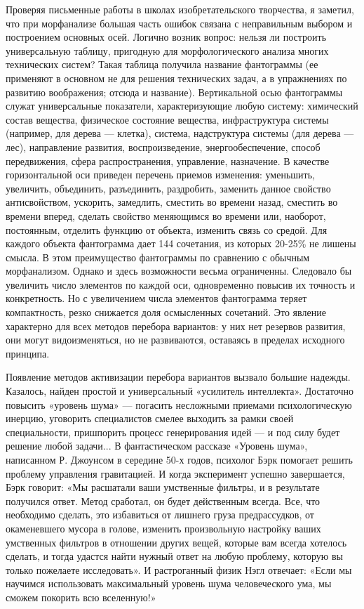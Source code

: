 Проверяя  письменные  работы  в школах  изобретательского  творчества,
я  заметил,  что  при  морфанализе  большая  часть  ошибок  связана  с
неправильным  выбором  и  построением основных  осей.  Логично  возник
вопрос:  нельзя  ли  построить универсальную  таблицу,  пригодную  для
морфологического  анализа  многих  технических систем?  Такая  таблица
получила название фантограммы (ее применяют  в основном не для решения
технических  задач, а  в упражнениях  по развитию  воображения; отсюда
и  название).  Вертикальной   осью  фантограммы  служат  универсальные
показатели, характеризующие любую систему: химический состав вещества,
физическое  состояние  вещества,   инфраструктура  системы  (например,
для  дерева  —  клетка),  система, надструктура  системы  (для  дерева
—  лес),  направление  развития,  воспроизведение,  энергообеспечение,
способ передвижения, сфера  распространения, управление, назначение. В
качестве  горизонтальной  оси  приведен  перечень  приемов  изменения:
уменьшить,  увеличить, объединить,  разъединить, раздробить,  заменить
данное  свойство  антисвойством,   ускорить,  замедлить,  сместить  во
времени назад, сместить во времени вперед, сделать свойство меняющимся
во  времени или,  наоборот, постоянным,  отделить функцию  от объекта,
изменить связь  со средой.  Для каждого  объекта фантограмма  дает 144
сочетания, из  которых 20-25\%  не лишены  смысла. В  этом преимущество
фантограммы  по  сравнению  с  обычным морфанализом.  Однако  и  здесь
возможности весьма ограниченны. Следовало бы увеличить число элементов
по каждой оси,  одновременно повысив их точность и  конкретность. Но с
увеличением  числа элементов  фантограмма  теряет компактность,  резко
снижается доля осмысленных сочетаний.  Это явление характерно для всех
методов перебора  вариантов: у  них нет  резервов развития,  они могут
видоизменяться,  но не  развиваются,  оставаясь  в пределах  исходного
принципа.


Появление  методов  активизации  перебора  вариантов  вызвало  большие
надежды.   Казалось,  найден   простой   и  универсальный   «усилитель
интеллекта».   Достаточно   повысить   «уровень   шума»   —   погасить
несложными  приемами психологическую  инерцию, уговорить  специалистов
смелее  выходить  за  рамки своей  специальности,  пришпорить  процесс
генерирования  идей  —  и  под  силу  будет  решение  любой  задачи...
В  фантастическом  рассказе  «Уровень шума»,  написанном  Р.  Джоунсом
в  середине  50-х  годов,   психолог  Бэрк  помогает  решить  проблему
управления гравитацией. И когда  эксперимент успешно завершается, Бэрк
говорит:  «Мы  расшатали  ваши  умственные  фильтры,  и  в  результате
получился ответ. Метод сработал, он будет действенным всегда. Все, что
необходимо сделать, это избавиться  от лишнего груза предрассудков, от
окаменевшего мусора  в голове,  изменить произвольную  настройку ваших
умственных  фильтров  в отношении  других  вещей,  которые вам  всегда
хотелось  сделать,  и  тогда  удастся  найти  нужный  ответ  на  любую
проблему,  которую вы  только пожелаете  исследовать». И  растроганный
физик  Нэгл  отвечает:  «Если мы  научимся  использовать  максимальный
уровень шума человеческого ума, мы сможем покорить всю вселенную!»

